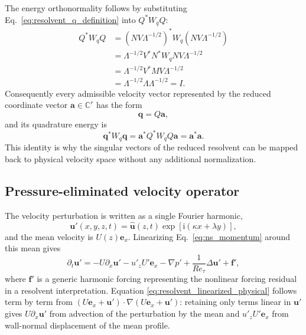\documentclass[11pt]{article}
\newcommand{\ii}{\mathrm{i}}
\newcommand{\bfa}{\bm{a}}
\newcommand{\bff}{\bm{f}}
\newcommand{\bfu}{\bm{u}}
\newcommand{\bfq}{\bm{q}}
\begin{document}
The energy orthonormality follows by substituting
Eq.~\eqref{eq:resolvent_q_definition} into \(Q^*W_qQ\):
\begin{align}
  Q^*W_qQ
  &=
  \left(NV\Lambda^{-1/2}\right)^*
  W_q
  \left(NV\Lambda^{-1/2}\right) \nonumber\\
  &=
  \Lambda^{-1/2}V^*N^*W_qNV\Lambda^{-1/2}
  \nonumber\\
  &=
  \Lambda^{-1/2}V^*MV\Lambda^{-1/2}
  \nonumber\\
  &=
  \Lambda^{-1/2}\Lambda\Lambda^{-1/2}
  =
  I.
  \label{eq:resolvent_q_orthonormality_proof}
\end{align}
Consequently every admissible velocity vector represented by the reduced
coordinate vector \(\bfa\in\mathbb{C}^{r}\) has the form
\begin{equation}
  \bfq = Q\bfa,
  \label{eq:resolvent_q_reduced_coordinates}
\end{equation}
and its quadrature energy is
\begin{equation}
  \bfq^*W_q\bfq
  =
  \bfa^*Q^*W_qQ\bfa
  =
  \bfa^*\bfa.
  \label{eq:resolvent_reduced_energy}
\end{equation}
This identity is why the singular vectors of the reduced resolvent can be
mapped back to physical velocity space without any additional normalization.

\subsection{Pressure-eliminated velocity operator}

The velocity perturbation is written as a single Fourier harmonic,
\begin{equation}
  \bfu'(x,y,z,t)
  =
  \widehat{\bfu}(z,t)
  \exp\left[\ii(\kappa x+\lambda y)\right],
  \label{eq:resolvent_spatial_harmonic}
\end{equation}
and the mean velocity is \(U(z)\bm{e}_x\). Linearizing
Eq.~\eqref{eq:ns_momentum} around this mean gives
\begin{equation}
  \partial_t\bfu'
  =
  -U\partial_x\bfu'
  -u'_z U'\bm{e}_x
  -\nabla p'
  +
  \frac{1}{Re_{\tau}}\Delta\bfu'
  +
  \bff',
  \label{eq:resolvent_linearized_physical}
\end{equation}
where \(\bff'\) is a generic harmonic forcing representing the nonlinear
forcing residual in a resolvent interpretation. Equation
\eqref{eq:resolvent_linearized_physical} follows term by term from
\((U\bm{e}_x+\bfu')\cdot\nabla(U\bm{e}_x+\bfu')\): retaining only terms linear
in \(\bfu'\) gives \(U\partial_x\bfu'\) from advection of the perturbation by
the mean and \(u'_z U'\bm{e}_x\) from wall-normal displacement of the mean
profile.
\end{document}
